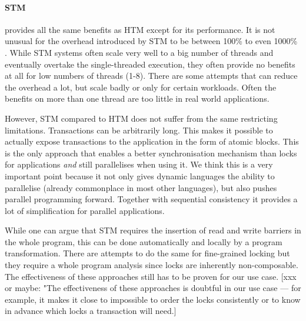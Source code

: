 \documentclass{sigplanconf}
\begin{document}

\paragraph{STM} provides all the same benefits as HTM except for its
performance.  It is not unusual for the overhead introduced by STM to
be between 100\% to even 1000\% \cite{cascaval08,drago11}. While STM
systems often scale very well to a big number of threads and
eventually overtake the single-threaded execution, they often provide
no benefits at all for low numbers of threads (1-8). There are some
attempts \cite{warmhoff13,spear09} that can reduce the overhead a lot,
but scale badly or only for certain workloads. Often the benefits
on more than one thread are too little in real world applications.

However, STM compared to HTM does not suffer from the same restricting
limitations. Transactions can be arbitrarily long.  This makes it
possible to actually expose transactions to the application in the
form of atomic blocks. This is the only approach that enables a better
synchronisation mechanism than locks for applications \emph{and} still
parallelises when using it. We think this is a very important point
because it not only gives dynamic languages the ability to parallelise
(already commonplace in most other languages), but also pushes
parallel programming forward. Together with sequential consistency it
provides a lot of simplification for parallel applications.

While one can argue that STM requires the insertion of read and write
barriers in the whole program, this can be done automatically and
locally by a program transformation\cite{felber07}. There are attempts
to do the same for fine-grained locking\cite{bill06} but they require
a whole program analysis since locks are inherently non-composable.
The effectiveness of these approaches still has to be proven for our
use case.
[xxx or maybe: "The effectiveness of these approaches is doubtful in our
use case --- for example, it makes it close to impossible to order the
locks consistently or to know in advance which locks a transaction will
need.]

\end{document}
